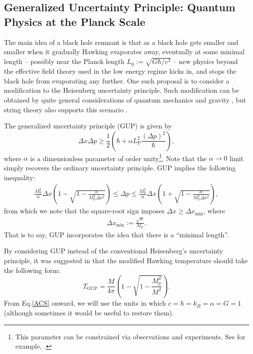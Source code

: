 \documentclass[12pt]{article}
\newcommand{\2}{$^2$}
\newcommand{\3}{$^3$}
\newcommand{\4}{$_4$}
\newcommand{\5}{$_5$}
\begin{document}
\subsection{Generalized Uncertainty Principle: Quantum Physics at the Planck Scale}

The main idea of a black hole remnant is that as a black hole gets smaller and smaller when it gradually Hawking evaporates away, eventually at some minimal length -- possibly near the Planck length $L_\text{p} := \sqrt{G\hbar/c^3}$ -- new physics beyond the effective field theory used in the low energy regime kicks in, and stops the black hole from evaporating any further. One such proposal is to consider a modification to the Heisenberg uncertainty principle. Such modification can be obtained by quite general considerations of quantum mechanics and gravity \cite{1, 2, 3, 4}, but string theory also supports this scenario \cite{5, 6, 7, 8, 9}. 

The generalized uncertainty principle (GUP) is given by
\begin{equation}\label{GUP}
\Delta x\Delta p \geqslant \frac{1}{2}\left(\hbar + \alpha L_{\text{P}}^2\frac{(\Delta p)^2}{\hbar}\right),
\end{equation}
where $\alpha$ is a dimensionless parameter of order unity\footnote{This parameter can be constrained via observations and experiments. See for example, \cite{SE1, FabioRoberto}.}. Note that the $\alpha \to 0$ limit simply recovers the ordinary uncertainty principle.
GUP implies the following inequality:
\begin{eqnarray}
\frac{M_{\mathrm{P}}^{2}}{\alpha} \Delta x \left( 1 - \sqrt{1 - \frac{\alpha}{M_{\mathrm{P}}^{2} \Delta x^{2}}} \right) \leqslant \Delta p \leqslant \frac{M_{\mathrm{P}}^{2}}{\alpha} \Delta x \left( 1 + \sqrt{1 - \frac{\alpha}{M_{\mathrm{P}}^{2} \Delta x^{2}}} \right),
\end{eqnarray}
from which we note that the square-root sign imposes $\Delta x \geqslant \Delta x_{\mathrm{min}}$, where
\begin{eqnarray}
\Delta x_{\mathrm{min}} := \frac{\sqrt{\alpha}}{M_{\mathrm{P}}}.
\end{eqnarray}
That is to say, GUP incorporates the idea that there is a ``minimal length''.

By considering GUP instead of the conventional Heisenberg's uncertainty principle, it was suggested in \cite{pisin} that the modified Hawking temperature should take the following form:
\begin{equation}\label{ACS}
T_{\text{GUP}} = \frac{M}{4\pi}\left(1-\sqrt{1-\frac{M_p^2}{M^2}}\right).
\end{equation}
From Eq.\ref{ACS} onward, we will use the units in which $c=\hbar=k_B=\alpha=G=1$ (although sometimes it would be useful to restore them). 
\end{document}
